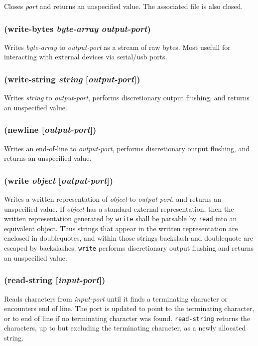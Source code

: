 \documentclass{article}
\begin{document}
Closes \emph{port} and returns an unspecified value. The associated file is also closed.

\subsubsection{(write-bytes \emph{byte-array} \emph{output-port})}

Writes \emph{byte-array} to \emph{output-port} as a stream of raw bytes. Most usefull for
interacting with external devices via serial/usb ports.

\subsubsection{(write-string \emph{string} [\emph{output-port}])}

Writes \emph{string} to \emph{output-port}, performs discretionary output flushing, and
returns an unspecified value.

\subsubsection{(newline [\emph{output-port}])}

Writes an end-of-line to \emph{output-port}, performs discretionary output flushing, and
returns an unspecified value.

\subsubsection{(write \emph{object} [\emph{output-port}])}

Writes a written representation of \emph{object} to \emph{output-port}, and returns an
unspecified value. If \emph{object} has a standard external representation, then the written
representation generated by \verb|write| shall be parsable by \verb|read| into an
equivalent object. Thus strings that appear in the written representation are enclosed in
doublequotes, and within those strings backslash and doublequote are escaped by backslashes.
\verb|write| performs discretionary output flushing and returns an unspecified value.

\subsubsection{(read-string [\emph{input-port}])}

Reads characters from \emph{input-port} until it finds a terminating character or encounters
end of line. The port is updated to point to the terminating character, or to end of line if
no terminating character was found. \verb|read-string| returns the characters, up to but
excluding the terminating character, as a newly allocated string.
\end{document}
